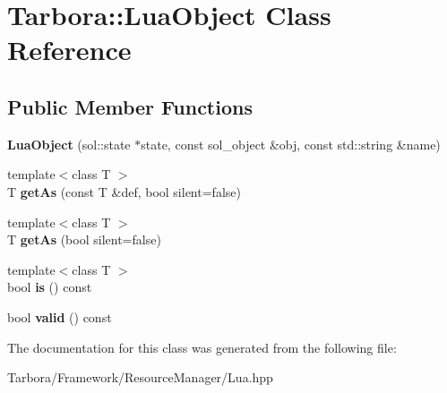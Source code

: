 \hypertarget{classTarbora_1_1LuaObject}{}\section{Tarbora\+:\+:Lua\+Object Class Reference}
\label{classTarbora_1_1LuaObject}
\subsection*{Public Member Functions}
\begin{DoxyCompactItemize}
\item 
\mbox{\label{classTarbora_1_1LuaObject_a7d2994ebac8b53f5a13e7e8598052258}} 
{\bfseries Lua\+Object} (sol\+::state $\ast$state, const sol\+\_\+object \&obj, const std\+::string \&name)
\item 
\mbox{\label{classTarbora_1_1LuaObject_a4cfaccca4154cfa60447d3a4b7511819}} 
{\footnotesize template$<$class T $>$ }\\T {\bfseries get\+As} (const T \&def, bool silent=false)
\item 
\mbox{\label{classTarbora_1_1LuaObject_a37572225ce07b19d0af2424bc8fe9888}} 
{\footnotesize template$<$class T $>$ }\\T {\bfseries get\+As} (bool silent=false)
\item 
\mbox{\label{classTarbora_1_1LuaObject_aa8c603f310becd90164522c9aa8f8969}} 
{\footnotesize template$<$class T $>$ }\\bool {\bfseries is} () const
\item 
\mbox{\label{classTarbora_1_1LuaObject_a5d3c5e80246a596d099f101bf42a1987}} 
bool {\bfseries valid} () const
\end{DoxyCompactItemize}


The documentation for this class was generated from the following file\+:\begin{DoxyCompactItemize}
\item 
Tarbora/\+Framework/\+Resource\+Manager/Lua.\+hpp\end{DoxyCompactItemize}
